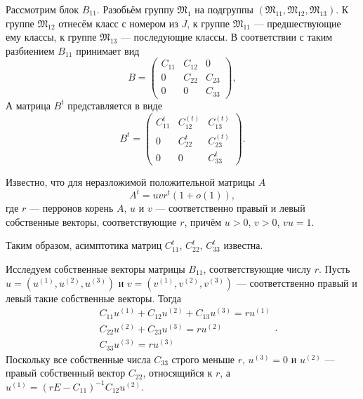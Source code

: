\documentclass[11pt]{article}
\begin{document}
Рассмотрим блок $B_{11}$. Разобьём группу $\mathfrak{M_1}$ на подгруппы $(\mathfrak{M_{11}}, \mathfrak{M_{12}}, \mathfrak{M_{13}})$. К группе $\mathfrak{M_{12}}$ отнесём класс с номером из $J$, к группе $\mathfrak{M_{11}}$ --- предшествующие ему классы, к группе $\mathfrak{M_{13}}$ --- последующие классы. В соответствии с таким разбиением $B_{11}$ принимает вид
\begin{equation}
    B = 
    \begin{pmatrix}
        C_{11} & C_{12} & 0 \\
        0 & C_{22} & C_{23} \\
        0 & 0 & C_{33}
    \end{pmatrix},
\end{equation}
А матрица $B^t$ представляется в виде
\begin{equation}
    B^t = 
    \begin{pmatrix}
        C_{11}^t & C_{12}^{(t)} & C_{13}^{(t)} \\
        0 & C_{22}^t & C_{23}^{(t)} \\
        0 & 0 & C_{33}^t
    \end{pmatrix}.
\end{equation}

Известно, что для неразложимой положительной матрицы $A$
\begin{equation}
    A^t = u v r^t (1 + o(1)),
\end{equation}
где $r$ --- перронов корень $A$, $u$ и $v$ --- соответственно правый и левый собственные векторы, соответствующие $r$, причём $u > 0$, $v > 0$, $vu = 1$.

Таким образом, асимптотика матриц $C_{11}^t$, $C_{22}^t$, $C_{33}^t$ известна.

Исследуем собственные векторы матрицы $B_{11}$, соответствующие числу $r$. Пусть $u = (u^{(1)}, u^{(2)}, u^{(3)})$ и $v = (v^{(1)}, v^{(2)}, v^{(3)})$ --- соответственно правый и левый такие собственные векторы. Тогда
\begin{equation}
    \begin{split}
        &C_{11} u^{(1)} + C_{12} u^{(2)} + C_{13} u^{(3)} = r u^{(1)} \\
        &C_{22} u^{(2)} + C_{23} u^{(3)} = r u^{(2)} \\
        &C_{33} u^{(3)} = r u^{(3)}
    \end{split}.
\end{equation}
Поскольку все собственные числа $C_{33}$ строго меньше $r$, $u^{(3)} = 0$ и $u^{(2)}$ --- правый собственный вектор $C_{22}$, относящийся к $r$, а $u^{(1)} = (rE - C_{11})^{-1} C_{12} u^{(2)}$.
\end{document}
